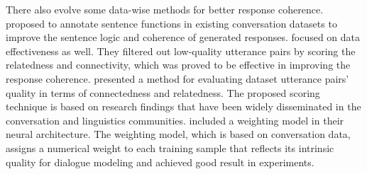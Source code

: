 There also evolve some data-wise methods for better response coherence.~ proposed to annotate sentence functions in existing conversation datasets to improve the sentence logic and coherence of generated responses.  focused on data effectiveness as well. They filtered out low-quality utterance pairs by scoring the relatedness and connectivity, which was proved to be effective in improving the response coherence.  presented a method for evaluating dataset utterance pairs' quality in terms of connectedness and relatedness. The proposed scoring technique is based on research findings that have been widely disseminated in the conversation and linguistics communities.  included a weighting model in their neural architecture. The weighting model, which is based on conversation data, assigns a numerical weight to each training sample that reflects its intrinsic quality for dialogue modeling and achieved good result in experiments.

